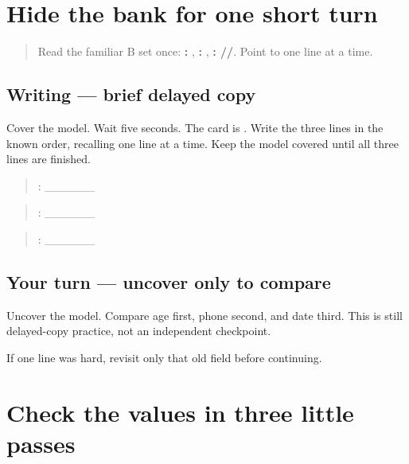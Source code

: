 \section[\texorpdfstring{\pa{ਉਮਰ}: · \pa{ਫ਼ੋਨ} … (delayed …)}{ਉਮਰ: · ਫ਼ੋਨ … (delayed …)}]{Hide the bank for one short turn}

\label{lesson:PA-W10-form-delayed}



\begin{quote}
Read the familiar B set once: \textbf{: }, \textbf{:  }, \textbf{: //}. Point to one line at a time.
\end{quote}

\subsection*{Writing — brief delayed copy}
Cover the model. Wait five seconds. The card is \textbf{}. Write the three lines in the known order, recalling one line at a time. Keep the model covered until all three lines are finished.

\begin{quote}
: \_\_\_\_\_\_
\end{quote}

\begin{quote}
: \_\_\_\_\_\_
\end{quote}

\begin{quote}
: \_\_\_\_\_\_
\end{quote}

\subsection*{Your turn — uncover only to compare}
Uncover the model. Compare age first, phone second, and date third. This is still delayed-copy practice, not an independent checkpoint.

\begin{tcolorbox}[breakable,colback=teal!4,colframe=teal!35!black,title={Before you move on}]
If one line was hard, revisit only that old field before continuing.
\end{tcolorbox}
\section[\texorpdfstring{\pa{੨੫} · \pa{੦੨੫} \pa{੧੨੫} … (three value checks)}{੨੫ · ੦੨੫ ੧੨੫ … (three value checks)}]{Check the values in three little passes}

